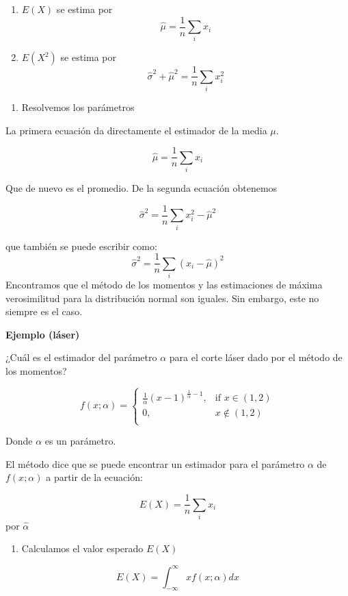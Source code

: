 \documentclass[
]{book}
\providecommand{\tightlist}{%
  \setlength{\itemsep}{0pt}\setlength{\parskip}{0pt}}
\begin{document}
\begin{enumerate}
\def\labelenumi{\alph{enumi}.}
\tightlist
\item
  \(E(X)\) se estima por \[\hat{\mu}=\frac{1}{n}\sum_i x_i\]
\item
  \(E(X^2)\) se estima por \[\hat{\sigma}^2+\hat{\mu}^2=\frac{1}{n}\sum_i x^2_i\]
\end{enumerate}

\begin{enumerate}
\def\labelenumi{\arabic{enumi}.}
\setcounter{enumi}{2}
\tightlist
\item
  Resolvemos los parámetros
\end{enumerate}

La primera ecuación da directamente el estimador de la media \(\mu\).

\[\hat{\mu}=\frac{1}{n}\sum_i x_i\]

Que de nuevo es el promedio. De la segunda ecuación obtenemos

\[\hat{\sigma}^2= \frac{1}{n} \sum_i x^2_i-\hat{\mu}^2\]

que también se puede escribir como:
\[\hat{\sigma}^2=\frac{1}{n} \sum_i(x_i-\hat{\mu})^2\]
Encontramos que el método de los momentos y las estimaciones de máxima verosimilitud para la distribución normal son iguales. Sin embargo, este no siempre es el caso.

\textbf{Ejemplo (láser)}

¿Cuál es el estimador del parámetro \(\alpha\) para el corte láser dado por el método de los momentos?

\[
    f(x; \alpha)= 
\begin{cases}
\frac{1}{\alpha}(x-1)^{\frac{1}{\alpha}-1},& \text{if } x \in (1,2)\\
    0,& x \notin (1,2)\\
\end{cases}
\]

Donde \(\alpha\) es un parámetro.

El método dice que se puede encontrar un estimador para el parámetro \(\alpha\) de \(f(x;\alpha)\) a partir de la ecuación:

\[E(X)=\frac{1}{n}\sum_i x_i\]
por \(\hat{\alpha}\)

\begin{enumerate}
\def\labelenumi{\arabic{enumi}.}
\tightlist
\item
  Calculamos el valor esperado \(E(X)\)
\end{enumerate}

\[E(X)=\int_{-\infty}^{\infty} xf(x;\alpha)dx\]
\end{document}
